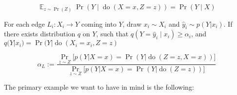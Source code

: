 \documentclass{article}
\newcommand{\E}{\mathop{\mathbb E}}
\theoremstyle{plain}
\newtheorem{claim}[theorem]{Claim}
\theoremstyle{definition}
\theoremstyle{remark}
\newcommand{\cdo}{\mathop{\mathrm{do}}}
\newcommand{\evt}[2]{#1\!\!=\!#2}
\begin{document}
	\[ \E_{z \sim \Pr(Z)}\Pr(Y \mid \cdo(X=x,Z=z)) = \Pr(Y \mid X) \]


%
%


For each edge $L_i : X_i \to Y$ coming into $Y$, draw $x_i \sim X_i$ and $\hat y_i \sim p(Y|x_i)$. 
If there exists distribution $q$ on $Y$, such that $q(Y=\hat y_i \mid x_i) \geq \alpha_i$, and $q(Y | x_i) = \Pr(Y | \cdo(\evt{X_i}{x_i}, \evt Zz) $


\[  \alpha_L :=  \frac{\Pr_{ z \sim Z} \Big[ p( Y | X=x) = \Pr(Y | \cdo(Z\!=\!z,X\!=\!x)) \Big]}{\Pr_{ z \sim Z} \Big[ p( Y | X=x) = \Pr(Y | \cdo(Z\!=\!z)) \Big]} \] 


The primary example we want to have in mind is the following:


\end{document}
